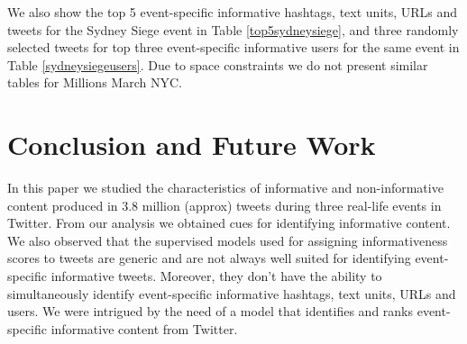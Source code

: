 We also show the top 5 event-specific informative hashtags, text units, URLs and tweets for the Sydney Siege event in Table \ref{top5sydneysiege}, and three randomly selected tweets for top three event-specific informative users for the same event in Table \ref{sydneysiegeusers}. Due to space constraints we do not present similar tables for Millions March NYC.




\section{Conclusion and Future Work}
In this paper we studied the characteristics of informative and non-informative content produced in 3.8 million (approx) tweets during three real-life events in Twitter. From our analysis we obtained cues for identifying informative content. We also observed that the supervised models used for assigning informativeness scores to tweets are generic and are not always well suited for identifying event-specific informative tweets. Moreover, they don't have the ability to simultaneously identify event-specific informative hashtags, text units, URLs and users. We were intrigued by the need of a model that identifies and ranks event-specific informative content from Twitter.

